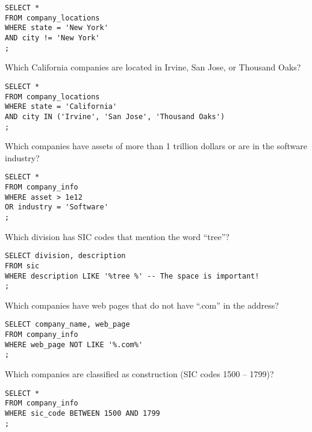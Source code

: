 \documentclass[10pt]{exam}
\begin{document}
\begin{questions}
\begin{solution}
\begin{lstlisting}
SELECT *
FROM company_locations
WHERE state = 'New York'
AND city != 'New York'
;
\end{lstlisting}
\end{solution}


\question Which California companies are located in Irvine, San Jose, or
Thousand Oaks?

\begin{solution}
\begin{lstlisting}
SELECT *
FROM company_locations
WHERE state = 'California'
AND city IN ('Irvine', 'San Jose', 'Thousand Oaks')
;
\end{lstlisting}
\end{solution}


\question Which companies have assets of more than 1 trillion dollars or are in the
software industry?

\begin{solution}
\begin{lstlisting}
SELECT *
FROM company_info
WHERE asset > 1e12
OR industry = 'Software'
;
\end{lstlisting}
\end{solution}


\question Which division has SIC codes that mention the word ``tree''?

\begin{solution}
\begin{lstlisting}
SELECT division, description
FROM sic
WHERE description LIKE '%tree %' -- The space is important!
;
\end{lstlisting}
\end{solution}


\question Which companies have web pages that do not have ``.com'' in the address?

\begin{solution}
\begin{lstlisting}
SELECT company_name, web_page
FROM company_info
WHERE web_page NOT LIKE '%.com%'
;
\end{lstlisting}
\end{solution}


\question Which companies are classified as construction (SIC codes 1500 --
1799)?

\begin{solution}
\begin{lstlisting}
SELECT *
FROM company_info
WHERE sic_code BETWEEN 1500 AND 1799
;
\end{lstlisting}
\end{solution}



\end{questions}
\end{document}
